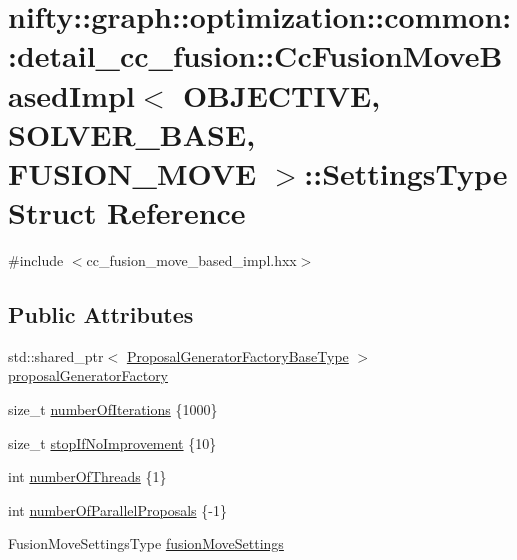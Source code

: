 \hypertarget{structnifty_1_1graph_1_1optimization_1_1common_1_1detail__cc__fusion_1_1CcFusionMoveBasedImpl_1_1SettingsType}{}\section{nifty\+:\+:graph\+:\+:optimization\+:\+:common\+:\+:detail\+\_\+cc\+\_\+fusion\+:\+:Cc\+Fusion\+Move\+Based\+Impl$<$ O\+B\+J\+E\+C\+T\+I\+V\+E, S\+O\+L\+V\+E\+R\+\_\+\+B\+A\+S\+E, F\+U\+S\+I\+O\+N\+\_\+\+M\+O\+V\+E $>$\+:\+:Settings\+Type Struct Reference}
\label{structnifty_1_1graph_1_1optimization_1_1common_1_1detail__cc__fusion_1_1CcFusionMoveBasedImpl_1_1SettingsType}


{\ttfamily \#include $<$cc\+\_\+fusion\+\_\+move\+\_\+based\+\_\+impl.\+hxx$>$}

\subsection*{Public Attributes}
\begin{DoxyCompactItemize}
\item 
std\+::shared\+\_\+ptr$<$ \hyperlink{classnifty_1_1graph_1_1optimization_1_1common_1_1detail__cc__fusion_1_1CcFusionMoveBasedImpl_a947607cc31008070837e3889069f9f94}{Proposal\+Generator\+Factory\+Base\+Type} $>$ \hyperlink{structnifty_1_1graph_1_1optimization_1_1common_1_1detail__cc__fusion_1_1CcFusionMoveBasedImpl_1_1SettingsType_aa5e7446cecc94c3e73445bf8617843f1}{proposal\+Generator\+Factory}
\item 
size\+\_\+t \hyperlink{structnifty_1_1graph_1_1optimization_1_1common_1_1detail__cc__fusion_1_1CcFusionMoveBasedImpl_1_1SettingsType_a6a0362a5a2227b3560e087825a861d10}{number\+Of\+Iterations} \{1000\}
\item 
size\+\_\+t \hyperlink{structnifty_1_1graph_1_1optimization_1_1common_1_1detail__cc__fusion_1_1CcFusionMoveBasedImpl_1_1SettingsType_ae4ca7c414154e28735a59e86531f532f}{stop\+If\+No\+Improvement} \{10\}
\item 
int \hyperlink{structnifty_1_1graph_1_1optimization_1_1common_1_1detail__cc__fusion_1_1CcFusionMoveBasedImpl_1_1SettingsType_a129c74645b2ca70fd7f72325297bc0cf}{number\+Of\+Threads} \{1\}
\item 
int \hyperlink{structnifty_1_1graph_1_1optimization_1_1common_1_1detail__cc__fusion_1_1CcFusionMoveBasedImpl_1_1SettingsType_ac762f365dd3f33fc472b4a781d6adb4b}{number\+Of\+Parallel\+Proposals} \{-\/1\}
\item 
Fusion\+Move\+Settings\+Type \hyperlink{structnifty_1_1graph_1_1optimization_1_1common_1_1detail__cc__fusion_1_1CcFusionMoveBasedImpl_1_1SettingsType_a239f8b806d3fac77af2c5ef744b21f54}{fusion\+Move\+Settings}
\end{DoxyCompactItemize}



